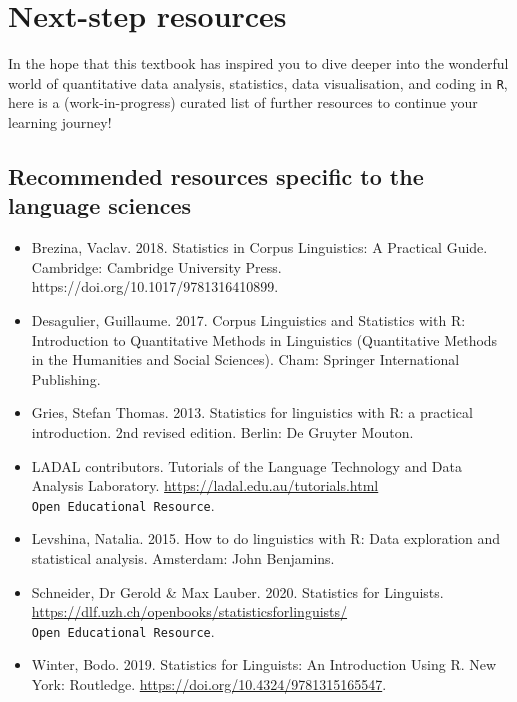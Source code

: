 \documentclass[
  letterpaper,
  DIV=11,
  numbers=noendperiod]{scrreprt}
\begin{document}
\cleardoublepage
{}
{}
\appendix

\chapter{Next-step resources}\label{sec-AppendixA}

In the hope that this textbook has inspired you to dive deeper into the
wonderful world of quantitative data analysis, statistics, data
visualisation, and coding in \texttt{R}, here is a (work-in-progress)
curated list of further resources to continue your learning journey!
🚀✨

\section{Recommended resources specific to the language
sciences}\label{recommended-resources-specific-to-the-language-sciences}

\begin{itemize}
\item
  Brezina, Vaclav. 2018. Statistics in Corpus Linguistics: A Practical
  Guide. Cambridge: Cambridge University Press.
  https://doi.org/10.1017/9781316410899.
\item
  Desagulier, Guillaume. 2017. Corpus Linguistics and Statistics with R:
  Introduction to Quantitative Methods in Linguistics (Quantitative
  Methods in the Humanities and Social Sciences). Cham: Springer
  International Publishing.
\item
  Gries, Stefan Thomas. 2013. Statistics for linguistics with R: a
  practical introduction. 2nd revised edition. Berlin: De Gruyter
  Mouton.
\item
  LADAL contributors. Tutorials of the Language Technology and Data
  Analysis Laboratory. \url{https://ladal.edu.au/tutorials.html}
  \texttt{Open\ Educational\ Resource}.
\item
  Levshina, Natalia. 2015. How to do linguistics with R: Data
  exploration and statistical analysis. Amsterdam: John Benjamins.
\item
  Schneider, Dr Gerold \& Max Lauber. 2020. Statistics for Linguists.
  \url{https://dlf.uzh.ch/openbooks/statisticsforlinguists/}
  \texttt{Open\ Educational\ Resource}.
\item
  Winter, Bodo. 2019. Statistics for Linguists: An Introduction Using R.
  New York: Routledge.
  \href{https://doi.org/10.1017/9781316410899}{https://doi.org/10.4324/9781315165547}.
\end{itemize}
\end{document}
